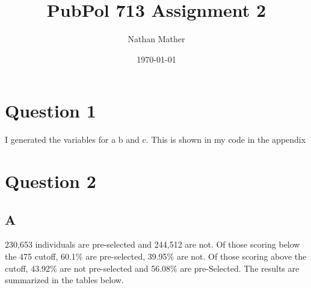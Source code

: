 \documentclass[11pt]{article}
\title{PubPol 713 Assignment 2} %
\author{Nathan Mather} %
\date{\today} %
\begin{document}
	
\maketitle %

\setcounter{tocdepth}{2} %


\section{ Question 1}

I generated the variables for a b and c. This is shown in my code in the appendix 


\section{ Question 2}

\subsection{A}
 230,653 individuals are pre-selected and 244,512 are not. Of those scoring below the 475 cutoff, 60.1\% are pre-selected, 39.95\% are not.  Of those scoring above the cutoff, 43.92\% are not pre-selected and 56.08\% are pre-Selected. The results are summarized in the tables below. 

\begin{center}
	\begin{tabular}{||c | c| c||} 
		\hline		
		
		\hline
		
	\end{tabular}
\end{center}


\begin{center}
	\begin{tabular}{||c | c | c| c||} 
		\hline
		
		
		\hline
		
	\end{tabular}
\end{center}
\end{document}
